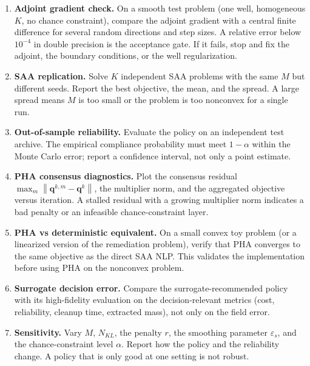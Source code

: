 \documentclass[11pt]{article}
\numberwithin{equation}{section}
\newcommand{\norm}[1]{\left\lVert #1 \right\rVert}
\newcommand{\qq}{\mathbf{q}}
\theoremstyle{plain}
\begin{document}
\begin{enumerate}[leftmargin=1.6em,itemsep=2pt]
  \item \textbf{Adjoint gradient check.}  On a smooth test problem (one well,
        homogeneous $K$, no chance constraint), compare the adjoint gradient
        with a central finite difference for several random directions and
        step sizes.  A relative error below $10^{-4}$ in double precision is
        the acceptance gate.  If it fails, stop and fix the adjoint, the
        boundary conditions, or the well regularization.
  \item \textbf{SAA replication.}  Solve $K$ independent SAA problems with the
        same $M$ but different seeds.  Report the best objective, the mean,
        and the spread.  A large spread means $M$ is too small or the problem
        is too nonconvex for a single run.
  \item \textbf{Out-of-sample reliability.}  Evaluate the policy on an
        independent test archive.  The empirical compliance probability must
        meet $1-\alpha$ within the Monte Carlo error; report a confidence
        interval, not only a point estimate.
  \item \textbf{PHA consensus diagnostics.}  Plot the consensus residual
        $\max_m\norm{\qq^{k,m}-\qq^k}$, the multiplier norm, and the
        aggregated objective versus iteration.  A stalled residual with a
        growing multiplier norm indicates a bad penalty or an infeasible
        chance-constraint layer.
  \item \textbf{PHA vs deterministic equivalent.}  On a small convex toy
        problem (or a linearized version of the remediation problem), verify
        that PHA converges to the same objective as the direct SAA NLP.  This
        validates the implementation before using PHA on the nonconvex
        problem.
  \item \textbf{Surrogate decision error.}  Compare the surrogate-recommended
        policy with its high-fidelity evaluation on the decision-relevant
        metrics (cost, reliability, cleanup time, extracted mass), not only on
        the field error.
  \item \textbf{Sensitivity.}  Vary $M$, $N_{KL}$, the penalty $r$, the
        smoothing parameter $\varepsilon_s$, and the chance-constraint level
        $\alpha$.  Report how the policy and the reliability change.  A policy
        that is only good at one setting is not robust.
\end{enumerate}
\end{document}

